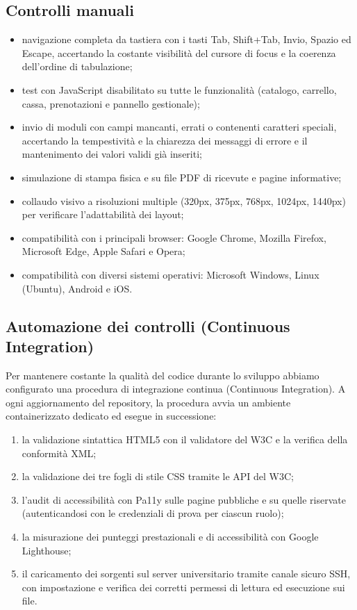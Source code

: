 \documentclass[a4paper,11pt]{article}
\begin{document}
\subsection{Controlli manuali}
\begin{itemize}
    \item navigazione completa da tastiera con i tasti Tab, Shift+Tab, Invio, Spazio ed Escape, accertando la costante visibilità del cursore di focus e la coerenza dell'ordine di tabulazione;
    \item test con JavaScript disabilitato su tutte le funzionalità (catalogo, carrello, cassa, prenotazioni e pannello gestionale);
    \item invio di moduli con campi mancanti, errati o contenenti caratteri speciali, accertando la tempestività e la chiarezza dei messaggi di errore e il mantenimento dei valori validi già inseriti;
    \item simulazione di stampa fisica e su file PDF di ricevute e pagine informative;
    \item collaudo visivo a risoluzioni multiple (320px, 375px, 768px, 1024px, 1440px) per verificare l'adattabilità dei layout;
    \item compatibilità con i principali browser: Google Chrome, Mozilla Firefox, Microsoft Edge, Apple Safari e Opera;
    \item compatibilità con diversi sistemi operativi: Microsoft Windows, Linux (Ubuntu), Android e iOS.
\end{itemize}

\subsection{Automazione dei controlli (Continuous Integration)}
Per mantenere costante la qualità del codice durante lo sviluppo abbiamo configurato una procedura di integrazione continua (Continuous Integration). A ogni aggiornamento del repository, la procedura avvia un ambiente containerizzato dedicato ed esegue in successione:
\begin{enumerate}
    \item la validazione sintattica HTML5 con il validatore del W3C e la verifica della conformità XML;
    \item la validazione dei tre fogli di stile CSS tramite le API del W3C;
    \item l'audit di accessibilità con Pa11y sulle pagine pubbliche e su quelle riservate (autenticandosi con le credenziali di prova per ciascun ruolo);
    \item la misurazione dei punteggi prestazionali e di accessibilità con Google Lighthouse;
    \item il caricamento dei sorgenti sul server universitario tramite canale sicuro SSH, con impostazione e verifica dei corretti permessi di lettura ed esecuzione sui file.
\end{enumerate}
\end{document}
